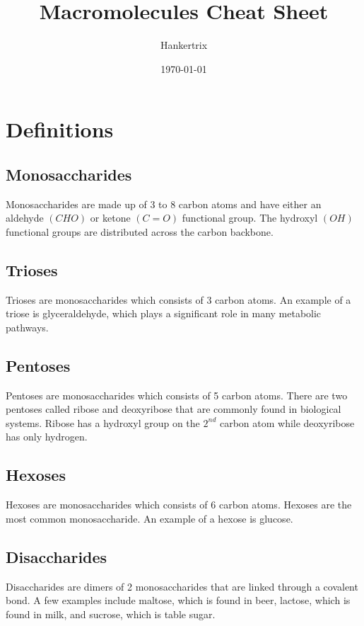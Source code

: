 \documentclass[11pt]{article}
\author{Hankertrix}
\date{\today}
\title{Macromolecules Cheat Sheet}
\begin{document}
\maketitle
\setcounter{tocdepth}{2}
\tableofcontents

\newpage

\section{Definitions}
\label{sec:orgdd0b91d}

\subsection{Monosaccharides}
\label{sec:orge08a8ee}
Monosaccharides are made up of 3 to 8 carbon atoms and have either an aldehyde \((CHO)\) or ketone \((C=O)\) functional group. The hydroxyl \((OH)\) functional groups are distributed across the carbon backbone.

\subsection{Trioses}
\label{sec:orgb07f24f}
Trioses are monosaccharides which consists of 3 carbon atoms. An example of a triose is glyceraldehyde, which plays a significant role in many metabolic pathways.

\subsection{Pentoses}
\label{sec:orgdc09749}
Pentoses are monosaccharides which consists of 5 carbon atoms. There are two pentoses called ribose and deoxyribose that are commonly found in biological systems. Ribose has a hydroxyl group on the \(2^{nd}\) carbon atom while deoxyribose has only hydrogen.

\subsection{Hexoses}
\label{sec:org65090c3}
Hexoses are monosaccharides which consists of 6 carbon atoms. Hexoses are the most common monosaccharide. An example of a hexose is glucose.

\subsection{Disaccharides}
\label{sec:orgab5952e}
Disaccharides are dimers of 2 monosaccharides that are linked through a covalent bond. A few examples include maltose, which is found in beer, lactose, which is found in milk, and sucrose, which is table sugar.
\\[0pt]
\end{document}
